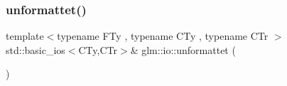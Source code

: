 \mbox{\label{namespaceglm_1_1io_a3095de031a9c7c3dd9bab670381c3cdb}} 
\subsubsection{\texorpdfstring{unformattet()}{unformattet()}}
{\footnotesize\ttfamily template$<$typename F\+Ty , typename C\+Ty , typename C\+Tr $>$ \\
std\+::basic\+\_\+ios$<$C\+Ty,C\+Tr$>$\& glm\+::io\+::unformattet (\begin{DoxyParamCaption}\item[{std\+::basic\+\_\+ios$<$ C\+Ty, C\+Tr $>$ \&}]{ }\end{DoxyParamCaption})}

